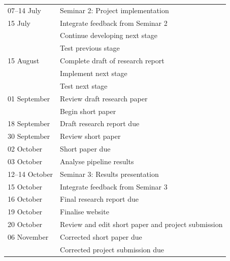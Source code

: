 \documentclass[11pt,a4paper]{article}
\begin{document}
\begin{tabular}{p{3cm}|p{10cm}}
07--14 July & Seminar 2: Project implementation \\

15 July & Integrate feedback from Seminar 2 \\
        & Continue developing next stage \\
        & Test previous stage \\

15 August & Complete draft of research report \\
          & Implement next stage \\
          & Test next stage \\

01 September & Review draft research paper \\
             & Begin short paper \\

18 September & Draft research report due \\

30 September & Review short paper \\

02 October & Short paper due \\

03 October & Analyse pipeline results \\

12--14 October & Seminar 3: Results presentation \\

15 October & Integrate feedback from Seminar 3 \\

16 October & Final research report due \\

19 October & Finalise website \\

20 October & Review and edit short paper and project submission \\

06 November & Corrected short paper due \\
            & Corrected project submission due \\

\bottomrule
\end{tabular}
\vspace{10em}

 
\end{document}
